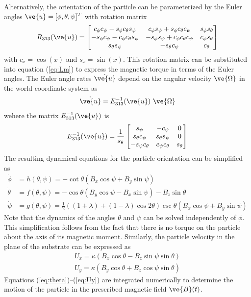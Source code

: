 Alternatively, the orientation of the particle can be parameterized by the Euler angles $\ve{u}=[\phi,\theta,\psi]^T$ with rotation matrix\autocite{Diebel2006}
\begin{equation}
    R_{313}(\ve{u}) = \begin{bmatrix} 
     c_\phi c_\psi -  s_\phi c_\theta s_\psi  &  c_\phi s_\psi + s_\phi c_\theta c_\psi  &  s_\phi s_\theta \\
   -s_\phi c_\psi  - c_\phi c_\theta s_\psi &  -s_\phi s_\psi + c_\phi  c_\theta c_\psi &  c_\phi s_\theta  \\
    s_\theta s_\psi  & - s_\theta c_\psi  & c_\theta  \end{bmatrix}
\end{equation}
with $c_x =\cos(x)$ and $s_x=\sin(x)$. This rotation matrix can be substituted into equation (\ref{eq:Lm}) to express the magnetic torque in terms of the Euler angles. The Euler angle rates $\dot{\ve{u}}$ depend on the angular velocity $\ve{\Omega}$ in the world coordinate system as 
\begin{equation}
    \dot{\ve{u}} = E_{313}^{-1}(\ve{u})~ \ve{\Omega}
\end{equation}
wehere the matrix $ E_{313}^{-1}(\ve{u})$ is \begin{equation}
    E^{-1}_{313}(\ve{u}) = \frac{1}{s_{\theta}}\begin{bmatrix} 
     s_{\psi} & -c_{\psi} & 0
     \\
     s_{\theta} c_{\psi} & s_{\theta} s_{\psi} & 0
     \\
     -s_{\psi}c_{\theta} & c_{\psi}c_{\theta} & s_{\theta}
     \end{bmatrix}
\end{equation}
The resulting dynamical equations for the particle orientation can be simplified as
\begin{align}
    \dot{\phi} &= h(\theta,\psi) = -\cot \theta (B_x\cos\psi +B_y\sin\psi)
    \\
    \dot{\theta} &= f(\theta,\psi) = -\cos\theta (B_y \cos\psi - B_x \sin\psi) - B_z\sin\theta \label{eq:theta}
    \\
    \dot{\psi} &= g(\theta,\psi) = \tfrac{1}{2} \left((1+\lambda) +(1-\lambda)\cos2\theta \right) \csc\theta (B_x \cos \psi + B_y\sin\psi ) \label{eq:psi}
\end{align}
Note that the dynamics of the angles $\theta$ and $\psi$ can be solved independently of $\phi$.  This simplification follows from the fact that there is no torque on the particle about the axis of its magnetic moment. Similarly, the particle velocity in the plane of the substrate can be expressed as
\begin{align}
    U_x = \kappa (B_x \cos \theta -  B_z \sin \psi \sin\theta) \label{eq:Ux}
    \\
    U_y = \kappa (B_y \cos\theta + B_z \cos\psi \sin\theta ) \label{eq:Uy}
\end{align}
Equations (\ref{eq:theta})--(\ref{eq:Uy}) are integrated numerically to determine the motion of the particle in the prescribed magnetic field $\ve{B}(t)$.

